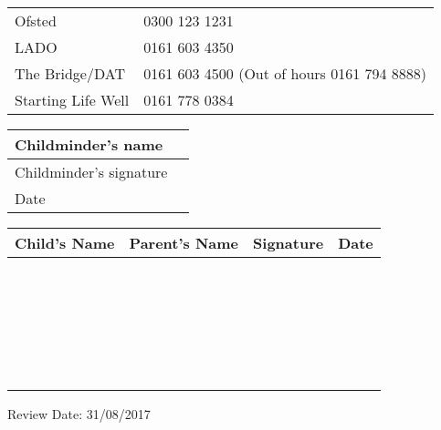 \begin{table}[h]
  \begin{tabularx}{\textwidth}{lX}
    Ofsted & 0300 123 1231 \\
    LADO & 0161 603 4350 \\
    The Bridge/DAT & 0161 603 4500 (Out of hours 0161 794 8888) \\
    Starting Life Well & 0161 778 0384 \\ 
 \end{tabularx}
\end{table}

\begin{table}[h]
  \def\arraystretch{2.0}
  \begin{tabularx}{\textwidth}{|l|X|}
    \hline
    Childminder's name & \\
    \hline
    Childminder's signature &  \\
    \hline
    Date & \\
    \hline
  \end{tabularx}
\end{table}

\begin{table}[H]
  \def\arraystretch{2.0}
  \begin{tabularx}{\textwidth}{|X|X|X|X|}
    \hline
    Child's Name & Parent's Name & Signature & Date \\
    \hline
    ~ & ~ & ~ & \\
    \hline
    ~ & ~ & ~ & \\
    \hline
    ~ & ~ & ~ & \\
    \hline
    ~ & ~ & ~ & \\
    \hline
    ~ & ~ & ~ & \\
    \hline
  \end{tabularx}
\end{table}

Review Date: 31/08/2017



